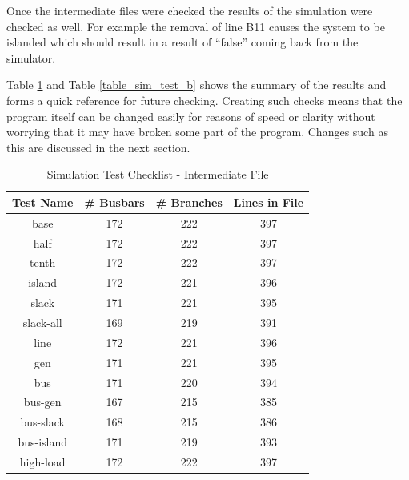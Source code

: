 \documentclass[a4paper,oneside,12pt]{report}
\begin{document}
Once the intermediate files were checked the results of the simulation
were checked as well. For example the removal of line B11 causes the
system to be islanded which should result in a result of ``false''
coming back from the simulator.

Table \ref{table_sim_test_a} and Table \ref{table_sim_test_b} shows the summary of the results and forms a quick
reference for future checking. Creating such checks means that the program itself can be changed easily for
reasons of speed or clarity without worrying that it may have broken some part of the program. Changes such as this are discussed in the next section.

\begin{table}[htbp]
\caption{Simulation Test Checklist - Intermediate File}
\label{table_sim_test_a}
\centering
\begin{tabular}{c||c||c||c}
\bfseries Test Name & \bfseries \# Busbars & \bfseries \# Branches & \bfseries Lines in File \\
\hline \hline
base      & 172& 222     & 397 \\
half      & 172& 222     & 397 \\
tenth     & 172& 222     & 397 \\
island    & 172& 221     & 396 \\
slack     & 171& 221     & 395 \\
slack-all & 169& 219     & 391 \\
line      & 172& 221     & 396 \\
gen       & 171& 221     & 395 \\
bus       & 171& 220     & 394 \\
bus-gen   & 167& 215     & 385 \\
bus-slack & 168& 215     & 386 \\
bus-island& 171& 219     & 393 \\
high-load & 172& 222     & 397 \\
\hline
\end{tabular}\\
\end{table}
\end{document}
